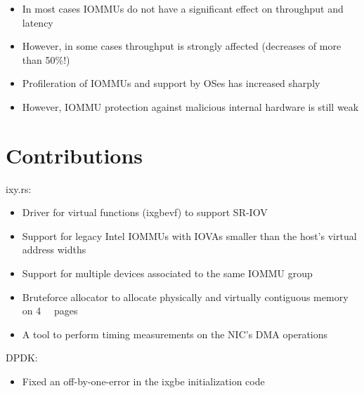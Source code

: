 \begin{frame}
    \begin{itemize}
        \item In most cases IOMMUs do not have a significant effect on throughput
            and latency
        \item However, in some cases throughput is strongly affected (decreases
            of more than 50\%!)
        \item Profileration of IOMMUs and support by OSes has increased sharply
        \item However, IOMMU protection against malicious internal hardware is
            still weak
    \end{itemize}
\end{frame}

\section{Contributions}

\begin{frame}
    ixy.rs:

    \begin{itemize}
        \item Driver for virtual functions (ixgbevf) to support SR-IOV
        \item Support for legacy Intel IOMMUs with IOVAs smaller than the host's
            virtual address widths
        \item Support for multiple devices associated to the same IOMMU group
        \item Bruteforce allocator to allocate physically and virtually
            contiguous memory on \SI{4}{\kibi\byte} pages
        \item A tool to perform timing measurements on the NIC's DMA operations
    \end{itemize}

    \vspace{1em}

    DPDK:

    \begin{itemize}
        \item Fixed an off-by-one-error in the ixgbe initialization code
    \end{itemize}
\end{frame}

